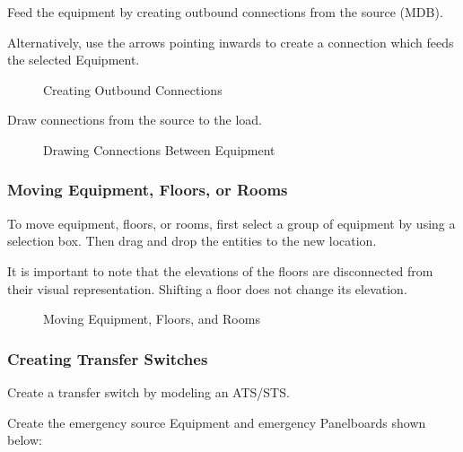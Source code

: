 \documentclass[letterpaper,10pt,english]{sphinxmanual}
\begin{document}
Feed the equipment by creating outbound connections from the source (MDB).

Alternatively, use the arrows pointing inwards to create a connection which feeds the selected Equipment.

\begin{figure}[H]
\centering
\capstart

\noindent{}
\caption{Creating Outbound Connections}\label{\detokenize{docs/tutorial/index-tutorial:id16}}\end{figure}

Draw connections from the source to the load.

\begin{figure}[H]
\centering
\capstart

\noindent{}
\caption{Drawing Connections Between Equipment}\label{\detokenize{docs/tutorial/index-tutorial:id17}}\end{figure}


\subsubsection{Moving Equipment, Floors, or Rooms}
\label{\detokenize{docs/tutorial/index-tutorial:moving-equipment-floors-or-rooms}}
To move equipment, floors, or rooms, first select a group of equipment by using a selection box.  Then drag and drop the entities to the new location.

It is important to note that the elevations of the floors are disconnected from their visual representation.  Shifting a floor does not change its elevation.

\begin{figure}[H]
\centering
\capstart

\noindent{}
\caption{Moving Equipment, Floors, and Rooms}\label{\detokenize{docs/tutorial/index-tutorial:id18}}\end{figure}


\subsubsection{Creating Transfer Switches}
\label{\detokenize{docs/tutorial/index-tutorial:creating-transfer-switches}}
Create a transfer switch by modeling an ATS/STS.

Create the emergency source Equipment and emergency Panelboards shown below:
\end{document}
